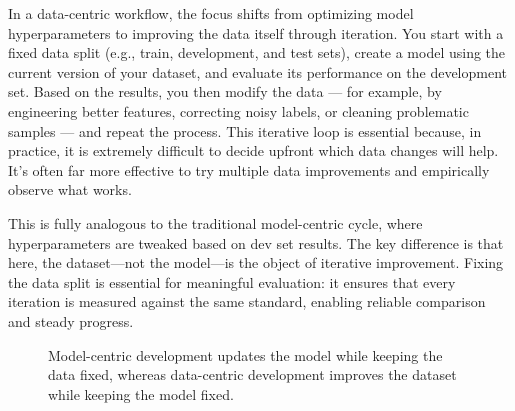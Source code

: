 \documentclass[12pt,openany]{book}
\begin{document}
In a data-centric workflow, the focus shifts from optimizing model hyperparameters to improving the data itself through iteration. You start with a fixed data split (e.g., train, development, and test sets), create a model using the current version of your dataset, and evaluate its performance on the development set. Based on the results, you then modify the data — for example, by engineering better features, correcting noisy labels, or cleaning problematic samples — and repeat the process.
This iterative loop is essential because, in practice, it is extremely difficult to decide upfront which data changes will help. It's often far more effective to try multiple data improvements and empirically observe what works.
\newline

This is fully analogous to the traditional model-centric cycle, where hyperparameters are tweaked based on dev set results. The key difference is that here, the dataset—not the model—is the object of iterative improvement. Fixing the data split is essential for meaningful evaluation: it ensures that every iteration is measured against the same standard, enabling reliable comparison and steady progress.

\begin{figure}[H]
\centering
{}
\caption{Model-centric development updates the model while keeping the data fixed, whereas data-centric development improves the dataset while keeping the model fixed.}
\label{fig:model-vs-data-centric}
\end{figure}
\end{document}
